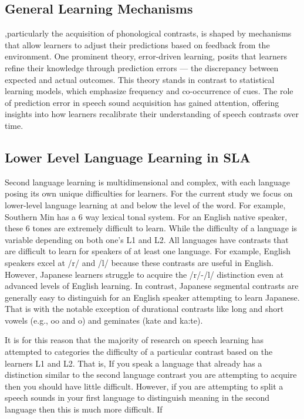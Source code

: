 \subsection{General Learning Mechanisms}

,particularly the acquisition of phonological contrasts, is shaped by mechanisms that allow learners to adjust their predictions based on feedback from the environment. One prominent theory, error-driven learning, posits that learners refine their knowledge through prediction errors — the discrepancy between expected and actual outcomes. This theory stands in contrast to statistical learning models, which emphasize frequency and co-occurrence of cues. The role of prediction error in speech sound acquisition has gained attention, offering insights into how learners recalibrate their understanding of speech contrasts over time.


\subsection{Lower Level Language Learning in SLA}

Second language learning is multidimensional and complex, with each language posing its own unique difficulties for learners. For the current study we focus on lower-level language learning at and below the level of the word. For example, Southern Min has a 6 way lexical tonal system. For an English native speaker, these 6 tones are extremely difficult to learn. While the difficulty of a language is variable depending on both one's L1 and L2. All languages have contrasts that are difficult to learn for speakers of at least one language. For example, English speakers excel at /r/ and /l/ because these contrasts are useful in English. However, Japanese learners struggle to acquire the /r/-/l/ distinction even at advanced levels of English learning. In contrast, Japanese segmental contrasts are generally easy to distinguish for an English speaker attempting to learn Japanese. That is with the notable exception of durational contrasts like long and short vowels (e.g., oo and o) and geminates (kate and ka:te). 

It is for this reason that the majority of research on speech learning has attempted to categories the difficulty of a particular contrast based on the learners L1 and L2. That is, If you speak a language that already has a distinction similar to the second language contrast you are attempting to acquire then you should have little difficult. However, if you are attempting to split a speech sounds in your first language to distinguish meaning in the second language then this is much more difficult. If 

